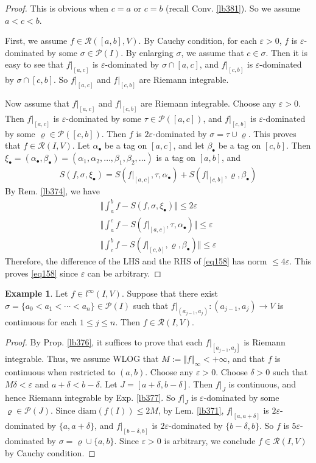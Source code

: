 \documentclass[12pt,b5paper,notitlepage]{article}
\theoremstyle{definition}
\newtheorem{eg}[df]{Example}
\theoremstyle{plain}
\newcommand{\mc}{\mathcal}
\newcommand{\scr}{\mathscr}
\newcommand{\blt}{\bullet}
\newcommand{\dps}{\displaystyle}
\newcommand{\diam}{\mathrm{diam}}
\newcommand{\eps}{\varepsilon}
\numberwithin{equation}{section}
\begin{document}
\begin{proof}
This is obvious when $c=a$ or $c=b$ (recall Conv. \ref{lb381}). So we assume $a<c<b$. 

First, we assume $f\in\scr R([a,b],V)$. By Cauchy condition, for each $\eps>0$, $f$ is $\eps$-dominated by some $\sigma\in\mc P(I)$.  By enlarging $\sigma$, we assume that $c\in\sigma$. Then it is easy to see that $f|_{[a,c]}$ is $\eps$-dominated by $\sigma\cap[a,c]$, and $f|_{[c,b]}$ is $\eps$-dominated by $\sigma\cap[c,b]$. So $f|_{[a,c]}$ and $f|_{[c,b]}$ are Riemann integrable.

Now assume that $f|_{[a,c]}$ and $f|_{[c,b]}$ are Riemann integrable. Choose any $\eps>0$. Then $f|_{[a,c]}$ is $\eps$-dominated by some $\tau\in \mc P([a,c])$, and $f|_{[c,b]}$ is $\eps$-dominated by some $\varrho\in\mc P([c,b])$. Then $f$ is $2\eps$-dominated by $\sigma=\tau\cup\varrho$. This proves that $f\in\scr R(I,V)$. Let  $\alpha_\blt$ be a tag on $[a,c]$, and let $\beta_\blt$ be  a tag on $[c,b]$. Then $\xi_\blt=(\alpha_\blt,\beta_\blt)=(\alpha_1,\alpha_2,\dots,\beta_1,\beta_2,\dots)$ is a tag on $[a,b]$, and
\begin{align*}
S(f,\sigma,\xi_\blt)=S(f|_{[a,c]},\tau,\alpha_\blt)+S(f|_{[c,b]},\varrho,\beta_\blt)
\end{align*} 
By Rem. \ref{lb374}, we have
\begin{gather*}
\Big\Vert \int_a^b f-S(f,\sigma,\xi_\blt) \Big\Vert\leq 2\eps\\
\Big\Vert \int_a^c f-S(f|_{[a,c]},\tau,\alpha_\blt) \Big\Vert\leq \eps\\
\Big\Vert \int_c^b f-S(f|_{[c,b]},\varrho,\beta_\blt) \Big\Vert\leq \eps
\end{gather*}
Therefore, the difference of the LHS and the RHS of \eqref{eq158} has norm $\leq 4\eps$. This proves \eqref{eq158} since $\eps$ can be arbitrary.
\end{proof}



\begin{eg}\label{lb378}
Let $f\in l^\infty(I,V)$. Suppose that there exist $\sigma=\{a_0<a_1<\cdots<a_n\}\in\mc P(I)$ such that $\dps f|_{(a_{j-1},a_j)}:(a_{j-1},a_j)\rightarrow V$ is continuous for each $1\leq j\leq n$. Then $f\in\scr R(I,V)$.
\end{eg}

\begin{proof}
By Prop. \ref{lb376}, it suffices to prove that each $f|_{[a_{j-1},a_j]}$ is Riemann integrable. Thus, we assume WLOG that $M:=\Vert f\Vert_\infty<+\infty$, and that $f$ is continuous when restricted to $(a,b)$. Choose any $\eps>0$. Choose $\delta>0$ such that $M\delta<\eps$ and $a+\delta<b-\delta$. Let $J=[a+\delta,b-\delta]$. Then $f|_J$ is continuous, and hence Riemann integrable by Exp. \ref{lb377}. So $f|_J$ is $\eps$-dominated by some $\varrho\in\mc P(J)$. Since $\diam(f(I))\leq 2M$, by Lem. \ref{lb371}, $f|_{[a,a+\delta]}$ is $2\eps$-dominated by $\{a,a+\delta\}$, and $f|_{[b-\delta,b]}$ is $2\eps$-dominated by $\{b-\delta,b\}$. So $f$ is $5\eps$-dominated by $\sigma=\varrho\cup\{a,b\}$. Since $\eps>0$ is arbitrary, we conclude $f\in\scr R(I,V)$ by Cauchy condition.
\end{proof}
\end{document}
